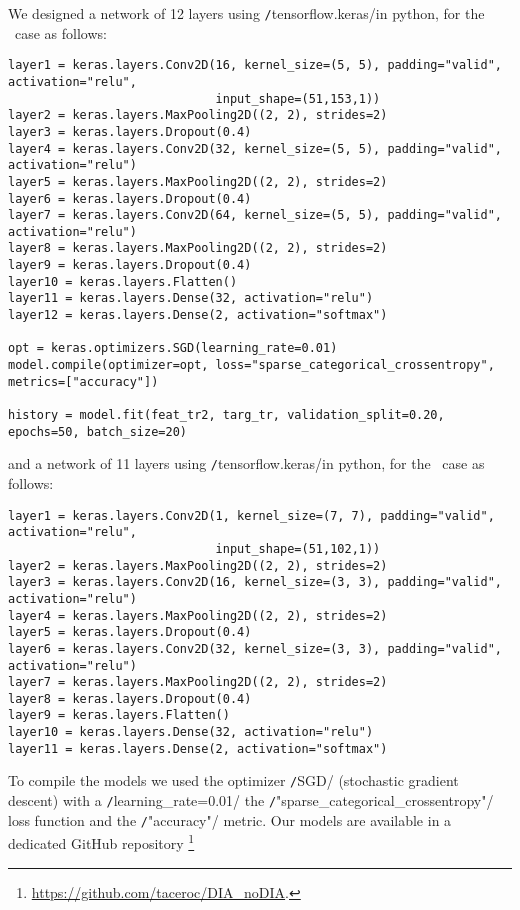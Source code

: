 



We designed a network of 12 layers using \texttt/tensorflow.keras/in python, for the \diabased\ case as follows:
\vspace{1cm}

\begin{verbatim}
layer1 = keras.layers.Conv2D(16, kernel_size=(5, 5), padding="valid", activation="relu", 
                             input_shape=(51,153,1))
layer2 = keras.layers.MaxPooling2D((2, 2), strides=2)
layer3 = keras.layers.Dropout(0.4)
layer4 = keras.layers.Conv2D(32, kernel_size=(5, 5), padding="valid", activation="relu")
layer5 = keras.layers.MaxPooling2D((2, 2), strides=2)
layer6 = keras.layers.Dropout(0.4)
layer7 = keras.layers.Conv2D(64, kernel_size=(5, 5), padding="valid", activation="relu")
layer8 = keras.layers.MaxPooling2D((2, 2), strides=2)
layer9 = keras.layers.Dropout(0.4)
layer10 = keras.layers.Flatten()
layer11 = keras.layers.Dense(32, activation="relu")
layer12 = keras.layers.Dense(2, activation="softmax")

opt = keras.optimizers.SGD(learning_rate=0.01)
model.compile(optimizer=opt, loss="sparse_categorical_crossentropy", metrics=["accuracy"])

history = model.fit(feat_tr2, targ_tr, validation_split=0.20, epochs=50, batch_size=20)
\end{verbatim}

\vspace{1cm}

\noindent and a network of 11 layers using  \texttt/tensorflow.keras/in python, for the \nodia\ case as follows:
\vspace{1cm}

\begin{verbatim}
layer1 = keras.layers.Conv2D(1, kernel_size=(7, 7), padding="valid", activation="relu", 
                             input_shape=(51,102,1))
layer2 = keras.layers.MaxPooling2D((2, 2), strides=2)
layer3 = keras.layers.Conv2D(16, kernel_size=(3, 3), padding="valid", activation="relu")
layer4 = keras.layers.MaxPooling2D((2, 2), strides=2)
layer5 = keras.layers.Dropout(0.4)
layer6 = keras.layers.Conv2D(32, kernel_size=(3, 3), padding="valid", activation="relu")
layer7 = keras.layers.MaxPooling2D((2, 2), strides=2)
layer8 = keras.layers.Dropout(0.4)
layer9 = keras.layers.Flatten()
layer10 = keras.layers.Dense(32, activation="relu")
layer11 = keras.layers.Dense(2, activation="softmax")
\end{verbatim}
To compile the models we used the optimizer \texttt/SGD/ (stochastic gradient descent) with a \texttt/learning_rate=0.01/ the \texttt/"sparse_categorical_crossentropy"/ loss function and the \texttt/"accuracy"/ metric. Our models are available in a dedicated GitHub repository \footnote{\url{https://github.com/taceroc/DIA_noDIA}.}
